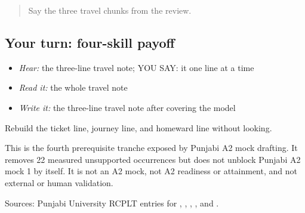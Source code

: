 \label{lesson:PA-C181-payoff}



\begin{quote}
Say the three travel chunks from the review.
\end{quote}

\subsection*{Your turn: four-skill payoff}
\begin{quote}
\textbf{                 }
\end{quote}

\begin{itemize}
\raggedright
  \item \emph{Hear:} the three-line travel note; YOU SAY: it one line at a time
  \item \emph{Read it:} the whole travel note
  \item \emph{Write it:} the three-line travel note after covering the model
\end{itemize}

\begin{tcolorbox}[breakable,colback=teal!4,colframe=teal!35!black,title={Before you move on}]
Rebuild the ticket line, journey line, and homeward line without looking.

This is the fourth prerequisite tranche exposed by Punjabi A2 mock drafting. It removes 22 measured unsupported occurrences but does not unblock Punjabi A2 mock 1 by itself. It is not an A2 mock, not A2 readiness or attainment, and not external or human validation.

Sources: Punjabi University RCPLT entries for \href{https://dic.learnpunjabi.org/default.aspx?look=\%E0\%A8\%B0\%E0\%A9\%87\%E0\%A8\%B2}{}, \href{https://dic.learnpunjabi.org/default.aspx?look=\%E0\%A8\%9F\%E0\%A8\%BF\%E0\%A8\%95\%E0\%A8\%9F}{}, \href{https://dic.learnpunjabi.org/default.aspx?look=\%E0\%A8\%AF\%E0\%A8\%BE\%E0\%A8\%A4\%E0\%A8\%B0\%E0\%A8\%BE}{}, \href{https://dic.learnpunjabi.org/default.aspx?look=\%E0\%A8\%B5\%E0\%A8\%BE\%E0\%A8\%AA\%E0\%A8\%B8}{}, and \href{https://dic.learnpunjabi.org/default.aspx?look=\%E0\%A8\%AA\%E0\%A9\%88\%E0\%A8\%A6\%E0\%A8\%B2}{}.
\end{tcolorbox}
